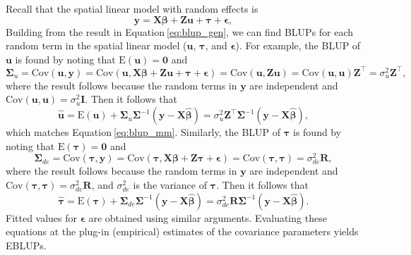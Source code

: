 \documentclass[10pt,letterpaper]{article}
\begin{document}
Recall that the spatial linear model with random effects is
\begin{equation*}
  \mathbf{y} = \mathbf{X} \boldsymbol{\beta} + \mathbf{Z} \mathbf{u} + \boldsymbol{\tau} + \boldsymbol{\epsilon},
\end{equation*} Building from the result in
Equation\(~\)\ref{eq:blup_gen}, we can find BLUPs for each random term
in the spatial linear model (\(\mathbf{u}\), \(\boldsymbol{\tau}\), and
\(\boldsymbol{\epsilon}\)). For example, the BLUP of \(\mathbf{u}\) is
found by noting that \(\text{E}(\mathbf{u}) = \mathbf{0}\) and
\begin{equation*}
  \mathbf{\Sigma}_u = \text{Cov}(\mathbf{u}, \mathbf{y}) = \text{Cov}(\mathbf{u}, \mathbf{X} \boldsymbol{\beta} + \mathbf{Z} \mathbf{u} + \boldsymbol{\tau} + \boldsymbol{\epsilon}) = \text{Cov}(\mathbf{u}, \mathbf{Z}\mathbf{u}) = \text{Cov}(\mathbf{u}, \mathbf{u})\mathbf{Z}^\top = \sigma^2_u \mathbf{Z}^\top,
\end{equation*} where the result follows because the random terms in
\(\mathbf{y}\) are independent and
\(\text{Cov}(\mathbf{u}, \mathbf{u}) = \sigma^2_u \mathbf{I}\). Then it
follows that \begin{equation*}
  \hat{\mathbf{u}} = \text{E}(\mathbf{u}) + \boldsymbol{\Sigma}_u \boldsymbol{\Sigma}^{-1}(\mathbf{y} - \mathbf{X} \boldsymbol{\hat{\beta}}) = \sigma^2_u \mathbf{Z}^\top \boldsymbol{\Sigma}^{-1}(\mathbf{y} - \mathbf{X} \boldsymbol{\hat{\beta}}),
\end{equation*} which matches Equation\(~\)\ref{eq:blup_mm}. Similarly,
the BLUP of \(\boldsymbol{\tau}\) is found by noting that
\(\text{E}(\boldsymbol{\tau}) = \mathbf{0}\) and \begin{equation*}
  \mathbf{\Sigma}_{de} = \text{Cov}(\boldsymbol{\tau}, \mathbf{y}) = \text{Cov}(\boldsymbol{\tau}, \mathbf{X} \boldsymbol{\beta} + \mathbf{Z} \boldsymbol{\tau} + \boldsymbol{\epsilon}) = \text{Cov}(\boldsymbol{\tau}, \boldsymbol{\tau}) = \sigma^2_{de} \mathbf{R},
\end{equation*} where the result follows because the random terms in
\(\mathbf{y}\) are independent and
\(\text{Cov}(\boldsymbol{\tau}, \boldsymbol{\tau}) = \sigma^2_{de} \mathbf{R}\),
and \(\sigma^2_{de}\) is the variance of \(\boldsymbol{\tau}\). Then it
follows that \begin{equation}\label{eq:blup_sp}
  \hat{\boldsymbol{\tau}} = \text{E}(\boldsymbol{\tau}) + \boldsymbol{\Sigma}_{de} \boldsymbol{\Sigma}^{-1}(\mathbf{y} - \mathbf{X} \boldsymbol{\hat{\beta}}) = \sigma^2_{de} \mathbf{R} \boldsymbol{\Sigma}^{-1}(\mathbf{y} - \mathbf{X} \boldsymbol{\hat{\beta}}).
\end{equation} Fitted values for \(\boldsymbol{\epsilon}\) are obtained
using similar arguments. Evaluating these equations at the plug-in
(empirical) estimates of the covariance parameters yields EBLUPs.
\end{document}
